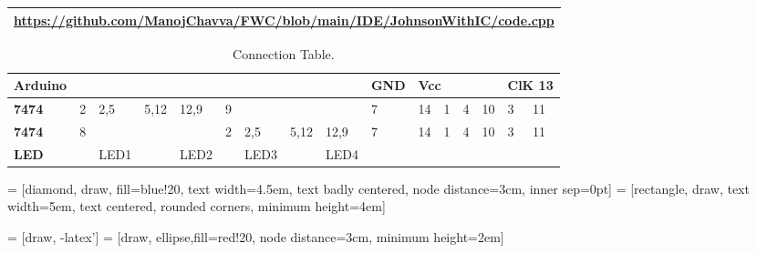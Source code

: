 \documentclass[journal,12pt,twocolumn]{IEEEtran}
\begin{document}
\newpage

\begin{table}[h]
\large
\centering
\begin{tabular}{|l|}
\hline

\url{https://github.com/ManojChavva/FWC/blob/main/IDE/JohnsonWithIC/code.cpp} \\
\hline

\end{tabular}

\end{table}


\begin{table}[h]
\large
\centering

\begin{tabular}{|l|l|l|l|l|l|l|l|l|l|llll|ll|}
\hline
\textbf{Arduino} &   &      &      &      &   &      &      &      & GND & \multicolumn{4}{l|}{Vcc}                                                       & \multicolumn{2}{l|}{ClK  13} \\ \hline
\textbf{7474}    & 2 & 2,5  & 5,12 & 12,9 & 9 &      &      &      & 7   & \multicolumn{1}{l|}{14} & \multicolumn{1}{l|}{1} & \multicolumn{1}{l|}{4} & 10 & \multicolumn{1}{l|}{3}  & 11 \\ \hline
\textbf{7474}    & 8 &      &      &      & 2 & 2,5  & 5,12 & 12,9 & 7   & \multicolumn{1}{l|}{14} & \multicolumn{1}{l|}{1} & \multicolumn{1}{l|}{4} & 10 & \multicolumn{1}{l|}{3}  & 11 \\ \hline
\textbf{LED}     &   & LED1 &      & LED2 &   & LED3 &      & LED4 &     & \multicolumn{1}{l|}{}   & \multicolumn{1}{l|}{}  & \multicolumn{1}{l|}{}  &    & \multicolumn{1}{l|}{}   &    \\ \hline
\end{tabular}

\caption{Connection Table.}
\label{table:1}
\end{table}






 



 = [diamond, draw, fill=blue!20, 
    text width=4.5em, text badly centered, node distance=3cm, inner sep=0pt]
 = [rectangle, draw, 
    text width=5em, text centered, rounded corners, minimum height=4em]

 = [draw, -latex']
 = [draw, ellipse,fill=red!20, node distance=3cm,
    minimum height=2em]
    
\end{document}
